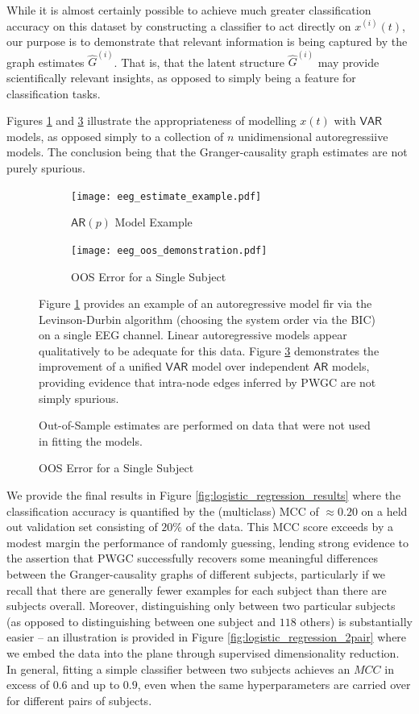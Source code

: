 \documentclass[12pt]{article}
\def\VAR{\mathsf{VAR}}  %
\begin{document}
While it is almost certainly possible to achieve much greater
classification accuracy on this dataset by constructing a classifier
to act directly on $x^{(i)}(t)$, our purpose is to demonstrate that
relevant information is being captured by the graph estimates
$\widehat{G}^{(i)}$.  That is, that the latent structure
$\widehat{G}^{(i)}$ may provide scientifically relevant insights, as
opposed to simply being a feature for classification tasks.

Figures \ref{fig:ar_eeg_example} and \ref{fig:eeg_oos_error}
illustrate the appropriateness of modelling $x(t)$ with $\VAR$ models,
as opposed simply to a collection of $n$ unidimensional
autoregressiive models.  The conclusion being that the
Granger-causality graph estimates are not purely spurious.

\begin{figure}
  \centering
  \begin{subfigure}[b]{0.45\textwidth}
    \caption{$\mathsf{AR}(p)$ Model Example}
    \label{fig:ar_eeg_example}
    \texttt{[image: eeg\_estimate\_example.pdf]}
  \end{subfigure}
  \begin{subfigure}[b]{0.45\textwidth}
    \caption{OOS Error for a Single Subject}
    \label{fig:eeg_oos_error}
    \texttt{[image: eeg\_oos\_demonstration.pdf]}
  \end{subfigure}

  {\scriptsize Figure \ref{fig:ar_eeg_example} provides an example of
    an autoregressive model fir via the Levinson-Durbin algorithm
    (choosing the system order via the BIC) on a single EEG channel.
    Linear autoregressive models appear qualitatively to be adequate
    for this data.  Figure \ref{fig:eeg_oos_error} demonstrates the
    improvement of a unified $\VAR$ model over independent
    $\mathsf{AR}$ models, providing evidence that intra-node edges
    inferred by PWGC are not simply spurious.

  Out-of-Sample estimates are performed on data that were not used in
  fitting the models.}
\end{figure}

We provide the final results in Figure
\ref{fig:logistic_regression_results} where the classification
accuracy is quantified by the (multiclass) MCC of $\approx 0.20$ on a held
out validation set consisting of $20\%$ of the data.  This MCC score
exceeds by a modest margin the performance of randomly guessing,
lending strong evidence to the assertion that PWGC successfully
recovers some meaningful differences between the Granger-causality
graphs of different subjects, particularly if we recall that there are
generally fewer examples for each subject than there are subjects
overall.  Moreover, distinguishing only between two particular
subjects (as opposed to distinguishing between one subject and $118$
others) is substantially easier -- an illustration is provided in
Figure \ref{fig:logistic_regression_2pair} where we embed the data
into the plane through supervised dimensionality reduction.  In
general, fitting a simple classifier between two subjects achieves an
$MCC$ in excess of $0.6$ and up to $0.9$, even when the same
hyperparameters are carried over for different pairs of subjects.
\end{document}
